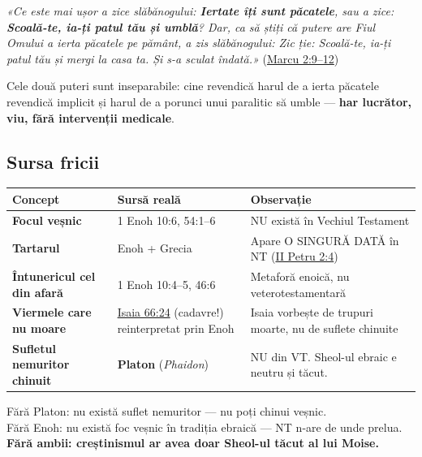 \documentclass[12pt,a4paper,twoside,openany]{book}
\begin{document}
\begin{biblequote}
\textit{«Ce este mai ușor a zice slăbănogului: \textbf{Iertate îți sunt păcatele}, sau a zice: \textbf{Scoală-te, ia-ți patul tău și umblă}? Dar, ca să știți că putere are Fiul Omului a ierta păcatele pe pământ, a zis slăbănogului: Zic ție: Scoală-te, ia-ți patul tău și mergi la casa ta. Și s-a sculat îndată.»} (\href{https://bibliaortodoxa.ro/carte.php?id=53\&cap=2\#9}{Marcu 2:9–12})
\end{biblequote}
Cele două puteri sunt inseparabile: cine revendică harul de a ierta păcatele revendică implicit și harul de a porunci unui paralitic să umble — \textbf{har lucrător, viu, fără intervenții medicale}.


\subsection{Sursa fricii}
\begin{center}
\small
\begin{tabular}{L{3.0cm}L{5.3cm}L{6.6cm}}
\toprule
{}
\textbf{Concept} & \textbf{Sursă reală} & \textbf{Observație} \\
\midrule
\textbf{Focul veșnic} & 1 Enoh 10:6, 54:1–6 & NU există în Vechiul Testament \\
\textbf{Tartarul} & Enoh + Grecia & Apare O SINGURĂ DATĂ în NT (\href{https://bibliaortodoxa.ro/carte.php?id=62\&cap=2\#4}{II Petru 2:4}) \\
\textbf{Întunericul cel din afară} & 1 Enoh 10:4–5, 46:6 & Metaforă enoică, nu veterotestamentară \\
\textbf{Viermele care nu moare} & \href{https://bibliaortodoxa.ro/carte.php?id=43\&cap=66\#24}{Isaia 66:24} (cadavre!) reinterpretat prin Enoh & Isaia vorbește de trupuri moarte, nu de suflete chinuite \\
\textbf{Sufletul nemuritor chinuit} & \textbf{Platon} (\textit{Phaidon}) & NU din VT. Sheol-ul ebraic e neutru și tăcut. \\
\bottomrule
\end{tabular}
\end{center}
\normalsize
Fără Platon: nu există suflet nemuritor — nu poți chinui veșnic. \\

Fără Enoh: nu există foc veșnic în tradiția ebraică — NT n-are de unde prelua. \\

\textbf{Fără ambii: creștinismul ar avea doar Sheol-ul tăcut al lui Moise.}
\end{document}
